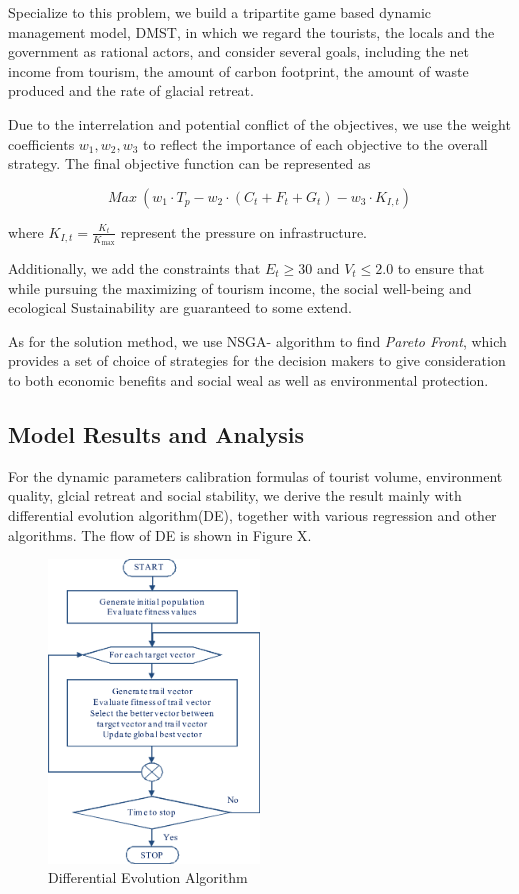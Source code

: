 \documentclass{mcmthesis}
\begin{document}
Specialize to this problem, we build a tripartite game based dynamic management model, DMST, in which 
we regard the tourists, the locals and the government as rational actors,
and consider several goals, including the net income from tourism, the amount of carbon footprint, 
the amount of waste produced and the rate of glacial retreat. 

Due to the interrelation and potential conflict of the objectives, we use the weight coefficients $w_1, w_2, w_3$ to reflect 
the importance of each objective to the overall strategy. The final objective function can be represented as 

\begin{equation}
  Max \ (w_1 \cdot T_p - w_2 \cdot (C_t + F_t + G_t) - w_3 \cdot K_{I,t})
\end{equation}

where $K_{I,t}=\frac{K_t}{K_{\text{max}}}$ represent the pressure on infrastructure.

Additionally, we add the constraints that $E_t \geq 30$ and $V_t \leq 2.0$ to ensure that
while pursuing the maximizing of tourism income, the social well-being and ecological Sustainability
are guaranteed to some extend.

As for the solution method, we use NSGA-\uppercase\expandafter{} algorithm to find
\emph{Pareto Front}, which provides a set of choice of strategies for the decision makers to give consideration to
both economic benefits and social weal as well as environmental protection.

\subsection{Model Results and Analysis}
For the dynamic parameters calibration formulas of tourist volume, environment quality, glcial retreat and social stability, we derive the result mainly with 
differential evolution algorithm(DE), together with various regression and other algorithms. The flow of DE is shown in Figure X.
\begin{figure}[H]
  \centering
  \includegraphics[width=0.5\textwidth]{figures/de.png}
  \caption{Differential Evolution Algorithm}
  \label{Figure.X}
\end{figure}
\end{document}

